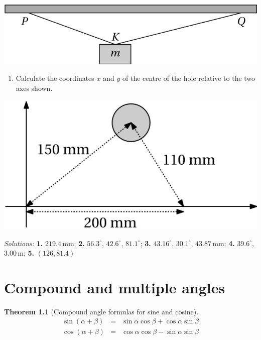 \documentclass[
  12pt,
  oneside]{book}
\providecommand{\tightlist}{%
  \setlength{\itemsep}{0pt}\setlength{\parskip}{0pt}}
\newtheorem{theorem}{Theorem}[chapter]
\theoremstyle{definition}
\theoremstyle{definition}
\theoremstyle{definition}
\theoremstyle{definition}
\theoremstyle{remark}
\begin{document}
\begin{center}\includegraphics{t19-beam} \end{center}

\begin{enumerate}
\def\labelenumi{\arabic{enumi}.}
\setcounter{enumi}{4}
\tightlist
\item
  Calculate the coordinates \(x\) and \(y\) of the centre of the hole relative to the two axes shown.
\end{enumerate}

\begin{center}\includegraphics{t19-hole} \end{center}

\emph{Solutions:}
\textbf{1.} \(219.4\,\mathrm{mm}\);
\textbf{2.} \(56.3^\circ\), \(42.6^\circ\), \(81.1^\circ\);
\textbf{3.} \(43.16^\circ\), \(30.1^\circ\), \(43.87\,\mathrm{mm}\);
\textbf{4.} \(39.6^\circ\), \(3.00\,\mathrm{m}\);
\textbf{5.} \((126,81.4)\)

\chapter{Compound and multiple angles}\label{compound-and-multiple-angles}

\begin{theorem}[Compound angle formulas for sine and cosine]
\protect\hypertarget{thm:t20-compsin}{}\label{thm:t20-compsin}\[
\boxed{
\begin{array}{rcl}
\sin(\alpha+\beta) &=& \sin\alpha\cos\beta + \cos\alpha\sin\beta\\
\cos(\alpha+\beta) &=& \cos\alpha\cos\beta - \sin\alpha\sin\beta
\end{array}
}\]
\end{theorem}
\end{document}
